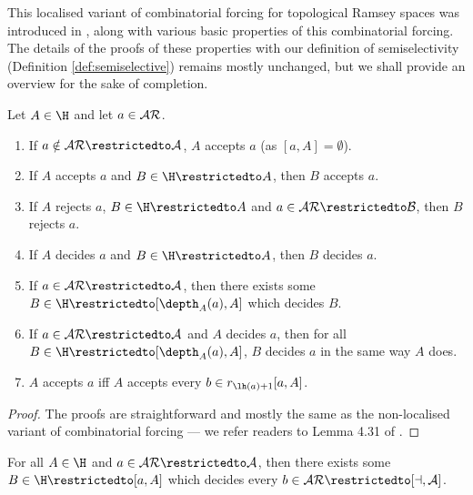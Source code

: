\documentclass[11pt,reqno]{amsart}
\begin{document}
This localised variant of combinatorial forcing for topological Ramsey spaces was introduced in \cite{DMN15}, along with various basic properties of this combinatorial forcing. The details of the proofs of these properties with our definition of semiselectivity (Definition \ref{def:semiselective}) remains mostly unchanged, but we shall provide an overview for the sake of completion.

\begin{lemma}
\label{lem:combinatorial.forcing.basics}
    Let $A \in \H$ and let $a \in \cal{AR}$.
    \begin{enumerate}
        \item If $a \notin\cal{AR}\restrictedto A$, $A$ accepts $a$ (as $[a,A] = \emptyset$).
        
        \item If $A$ accepts $a$ and $B \in \H\restrictedto A$, then $B$ accepts $a$.
        
        \item If $A$ rejects $a$, $B \in \H\restrictedto A$ and $a \in \cal{AR}\restrictedto B$, then $B$ rejects $a$.
        
        \item If $A$ decides $a$ and $B \in \H\restrictedto A$, then $B$ decides $a$.
        
        \item If $a \in \cal{AR}\restrictedto A$, then there exists some $B \in \H\restrictedto[\depth_A(a),A]$ which decides $B$.
        
        \item If $a \in \cal{AR}\restrictedto A$ and $A$ decides $a$, then for all $B \in \H\restrictedto[\depth_A(a),A]$, $B$ decides $a$ in the same way $A$ does.
        
        \item $A$ accepts $a$ iff $A$ accepts every $b \in r_{\lh(a)+1}[a,A]$.
    \end{enumerate}
\end{lemma}

\begin{proof}
    The proofs are straightforward and mostly the same as the non-localised variant of combinatorial forcing --- we refer readers to Lemma 4.31 of \cite{T10}.
\end{proof}

\begin{lemma}
\label{lem:decisive.reduction}
    For all $A \in \H$ and $a \in \cal{AR}\restrictedto A$, then there exists some $B \in \H\restrictedto[a,A]$ which decides every $b \in \cal{AR}\restrictedto[a,A]$.
\end{lemma}
\end{document}
